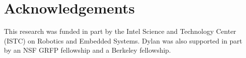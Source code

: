 \section*{Acknowledgements}
This research was funded in part by the Intel Science and Technology
Center (ISTC) on Robotics and Embedded Systems. Dylan was also
supported in part by an NSF GRFP fellowship and a Berkeley fellowship.
